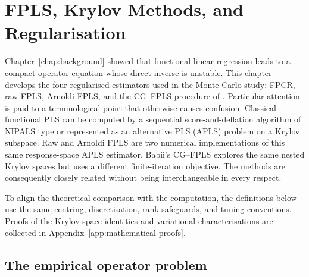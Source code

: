 \chapter{FPLS, Krylov Methods, and Regularisation}
\label{chap:methods}

Chapter~\ref{chap:background} showed that functional linear regression leads
to a compact-operator equation whose direct inverse is unstable.  This
chapter develops the four regularised estimators used in the Monte Carlo
study: FPCR, raw FPLS, Arnoldi FPLS, and the CG--FPLS procedure
of \textcite{babii_carrasco_tsafack_2026}.  Particular attention is paid to a
terminological point that otherwise causes confusion.  Classical functional
PLS can be computed by a sequential score-and-deflation algorithm of NIPALS
type or represented as an alternative PLS (APLS) problem on a Krylov
subspace.  Raw and Arnoldi FPLS are two numerical implementations of this
same response-space APLS estimator.  Babii's CG--FPLS explores the same
nested Krylov spaces but uses a different finite-iteration objective.  The
methods are consequently closely related without being interchangeable in
every respect.

To align the theoretical comparison with the computation, the definitions
below use the same centring, discretisation, rank safeguards, and tuning
conventions.  Proofs of the
Krylov-space identities and variational characterisations are collected in
Appendix~\ref{app:mathematical-proofs}.

\section{The empirical operator problem}
\label{sec:methods-empirical-operator}

